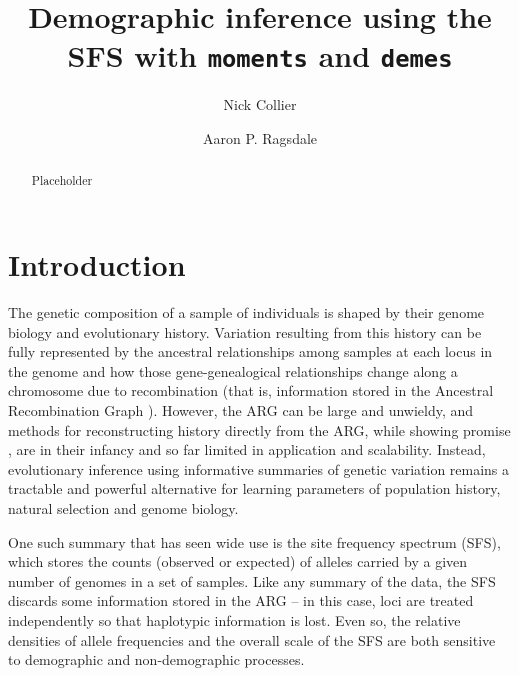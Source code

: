 \documentclass[]{article}
\newcommand{\moments}{\texttt{moments}\xspace}
\newcommand{\demes}{\texttt{demes}\xspace}
\begin{document}
\title{Demographic inference using the SFS with \moments and \demes}
\author[1]{Nick Collier}
\author[1,*]{Aaron P. Ragsdale}
\maketitle

\begin{abstract}
    Placeholder
\end{abstract}

\section*{Introduction}

The genetic composition of a sample of individuals is shaped by their genome
biology and evolutionary history. Variation resulting from this history can be
fully represented by the ancestral relationships among samples at each locus in
the genome and how those gene-genealogical relationships change along a
chromosome due to recombination (that is, information stored in the Ancestral
Recombination Graph \citep{nielsen2025inference}). However, the ARG can be
large and unwieldy, and methods for reconstructing history directly from the
ARG, while showing promise \citep[e.g.,][]{yc2022evaluation, fan2023likelihood,
brandt2024promise}, are in their infancy and so far limited in application and
scalability. Instead, evolutionary inference using informative summaries of
genetic variation remains a tractable and powerful alternative for learning
parameters of population history, natural selection and genome biology.

One such summary that has seen wide use is the site frequency spectrum (SFS),
which stores the counts (observed or expected) of alleles carried by a given
number of genomes in a set of samples. Like any summary of the data, the SFS
discards some information stored in the ARG -- in this case, loci are treated
independently so that haplotypic information is lost. Even so, the relative
densities of allele frequencies and the overall scale of the SFS are both
sensitive to demographic and non-demographic processes.
\end{document}
